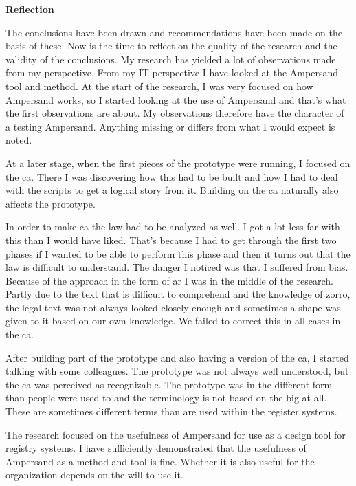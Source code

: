 \newpage
\textbf{\huge{Reflection}}

The conclusions have been drawn and recommendations have been made on the basis of these.
Now is the time to reflect on the quality of the research and the validity of the conclusions.
My research has yielded a lot of observations made from my perspective.
From my IT perspective I have looked at the Ampersand tool and method.
At the start of the research, I was very focused on how Ampersand works, so I started looking at the use of Ampersand and that's what the first observations are about.
My observations therefore have the character of a testing Ampersand.
Anything missing or differs from what I would expect is noted.

At a later stage, when the first pieces of the prototype were running, I focused on the \acrlong{ca}.
There I was discovering how this had to be built and how I had to deal with the scripts to get a logical story from it.
Building on the \acrlong{ca} naturally also affects the prototype.

In order to make \acrlong{ca} the law had to be analyzed as well.
I got a lot less far with this than I would have liked.
That's because I had to get through the first two phases if I wanted to be able to perform this phase and then it turns out that the law is difficult to understand.
The danger I noticed was that I suffered from bias.
Because of the approach in the form of \acrshort{ar} I was in the middle of the research.
Partly due to the text that is difficult to comprehend and the knowledge of \acrshort{zorro}, the legal text was not always looked closely enough and sometimes a shape was given to it based on our own knowledge.
We failed to correct this in all cases in the \acrlong{ca}.

After building part of the prototype and also having a version of the \acrlong{ca}, I started talking with some colleagues.
The prototype was not always well understood, but the \acrlong{ca} was perceived as recognizable.
The prototype was in the different form than people were used to and the terminology is not based on the \acrshort{big} at all.
These are sometimes different terms than are used within the register systems.

The research focused on the usefulness of Ampersand for use as a design tool for registry systems.
I have sufficiently demonstrated that the usefulness of Ampersand as a method and tool is fine.
Whether it is also useful for the organization depends on the will to use it.